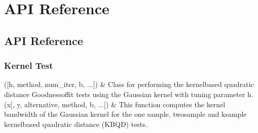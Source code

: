 \documentclass[letterpaper,10pt,english,openany,oneside]{sphinxmanual}
\begin{document}
\chapter{API Reference}
\label{\detokenize{index:id2}}
\sphinxstepscope


\section{API Reference}
\label{\detokenize{api_reference/index:module-QuadratiK.kernel_test}}\label{\detokenize{api_reference/index:id1}}\label{\detokenize{api_reference/index:api-reference}}\label{\detokenize{api_reference/index::doc}}

\subsection{Kernel Test}
\label{\detokenize{api_reference/index:kernel-test}}

\begin{savenotes}\sphinxattablestart
\sphinxthistablewithglobalstyle
\sphinxthistablewithnovlinesstyle
\centering
\begin{tabulary}{\linewidth}[t]{}
\sphinxtoprule
\sphinxtableatstartofbodyhook
\sphinxAtStartPar
{\hyperref[\detokenize{api_reference/generated/QuadratiK.kernel_test.KernelTest:QuadratiK.kernel_test.KernelTest}]{}}({[}h, method, num\_iter, b, ...{]})
&
\sphinxAtStartPar
Class for performing the kernel\sphinxhyphen{}based quadratic distance Goodness\sphinxhyphen{}of\sphinxhyphen{}fit tests using  the Gaussian kernel with tuning parameter h.
\\
\sphinxhline
\sphinxAtStartPar
{\hyperref[\detokenize{api_reference/generated/QuadratiK.kernel_test.select_h:QuadratiK.kernel_test.select_h}]{}}(x{[}, y, alternative, method, b, ...{]})
&
\sphinxAtStartPar
This function computes the kernel bandwidth of the Gaussian kernel for the  one sample, two\sphinxhyphen{}sample and ksample kernel\sphinxhyphen{}based quadratic distance (KBQD) tests.
\\
\sphinxbottomrule
\end{tabulary}
\sphinxtableafterendhook\par
\sphinxattableend\end{savenotes}
\end{document}
